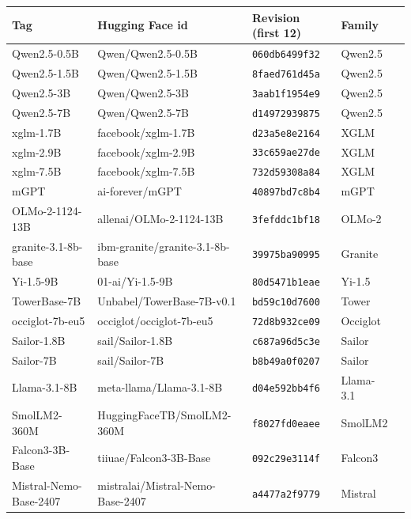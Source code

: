 \begin{center}\scriptsize
\begin{tabular}{lllll}
\toprule
Tag & Hugging Face id & Revision (first 12) & Family \\
\midrule
Qwen2.5-0.5B & Qwen/Qwen2.5-0.5B & \texttt{060db6499f32} & Qwen2.5 \\
Qwen2.5-1.5B & Qwen/Qwen2.5-1.5B & \texttt{8faed761d45a} & Qwen2.5 \\
Qwen2.5-3B & Qwen/Qwen2.5-3B & \texttt{3aab1f1954e9} & Qwen2.5 \\
Qwen2.5-7B & Qwen/Qwen2.5-7B & \texttt{d14972939875} & Qwen2.5 \\
xglm-1.7B & facebook/xglm-1.7B & \texttt{d23a5e8e2164} & XGLM \\
xglm-2.9B & facebook/xglm-2.9B & \texttt{33c659ae27de} & XGLM \\
xglm-7.5B & facebook/xglm-7.5B & \texttt{732d59308a84} & XGLM \\
mGPT & ai-forever/mGPT & \texttt{40897bd7c8b4} & mGPT \\
OLMo-2-1124-13B & allenai/OLMo-2-1124-13B & \texttt{3fefddc1bf18} & OLMo-2 \\
granite-3.1-8b-base & ibm-granite/granite-3.1-8b-base & \texttt{39975ba90995} & Granite \\
Yi-1.5-9B & 01-ai/Yi-1.5-9B & \texttt{80d5471b1eae} & Yi-1.5 \\
TowerBase-7B & Unbabel/TowerBase-7B-v0.1 & \texttt{bd59c10d7600} & Tower \\
occiglot-7b-eu5 & occiglot/occiglot-7b-eu5 & \texttt{72d8b932ce09} & Occiglot \\
Sailor-1.8B & sail/Sailor-1.8B & \texttt{c687a96d5c3e} & Sailor \\
Sailor-7B & sail/Sailor-7B & \texttt{b8b49a0f0207} & Sailor \\
Llama-3.1-8B & meta-llama/Llama-3.1-8B & \texttt{d04e592bb4f6} & Llama-3.1 \\
SmolLM2-360M & HuggingFaceTB/SmolLM2-360M & \texttt{f8027fd0eaee} & SmolLM2 \\
Falcon3-3B-Base & tiiuae/Falcon3-3B-Base & \texttt{092c29e3114f} & Falcon3 \\
Mistral-Nemo-Base-2407 & mistralai/Mistral-Nemo-Base-2407 & \texttt{a4477a2f9779} & Mistral \\
\bottomrule
\end{tabular}
\end{center}
